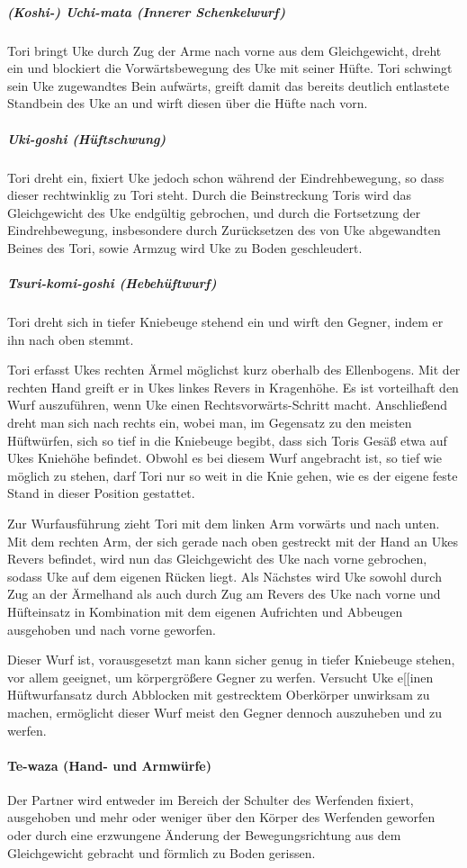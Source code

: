 \documentclass[justified, a4paper, notitlepage, captions=tableheading, nobib]{tufte-handout}
\begin{document}
\subparagraph{(Koshi-) Uchi-mata (Innerer Schenkelwurf)}
\label{sec:org84c4382}
Tori bringt Uke durch Zug der Arme nach vorne aus dem Gleichgewicht, dreht ein und blockiert die Vorwärtsbewegung des Uke mit seiner Hüfte. Tori schwingt sein Uke zugewandtes Bein aufwärts, greift damit das bereits deutlich entlastete Standbein des Uke an und wirft diesen über die Hüfte nach vorn.

\subparagraph{Uki-goshi (Hüftschwung)}
\label{sec:org3944742}
Tori dreht ein, fixiert Uke jedoch schon während der Eindrehbewegung, so dass dieser rechtwinklig zu Tori steht. Durch die Beinstreckung Toris wird das Gleichgewicht des Uke endgültig gebrochen, und durch die Fortsetzung der Eindrehbewegung, insbesondere durch Zurücksetzen des von Uke abgewandten Beines des Tori, sowie Armzug wird Uke zu Boden geschleudert.

\subparagraph{Tsuri-komi-goshi (Hebehüftwurf)}
\label{sec:org15ac607}
Tori dreht sich in tiefer Kniebeuge stehend ein und wirft den Gegner, indem er ihn nach oben stemmt.

Tori erfasst Ukes rechten Ärmel möglichst kurz oberhalb des Ellenbogens. Mit der rechten Hand greift er in Ukes linkes Revers in Kragenhöhe. Es ist vorteilhaft den Wurf auszuführen, wenn Uke einen Rechtsvorwärts-Schritt macht.
Anschließend dreht man sich nach rechts ein, wobei man, im Gegensatz zu den meisten Hüftwürfen, sich so tief in die Kniebeuge begibt, dass sich Toris Gesäß etwa auf Ukes Kniehöhe befindet. Obwohl es bei diesem Wurf angebracht ist, so tief wie möglich zu stehen, darf Tori nur so weit in die Knie gehen, wie es der eigene feste Stand in dieser Position gestattet.

Zur Wurfausführung zieht Tori mit dem linken Arm vorwärts und nach unten. Mit dem rechten Arm, der sich gerade nach oben gestreckt mit der Hand an Ukes Revers befindet, wird nun das Gleichgewicht des Uke nach vorne gebrochen, sodass Uke auf dem eigenen Rücken liegt. Als Nächstes wird Uke sowohl durch Zug an der Ärmelhand als auch durch Zug am Revers des Uke nach vorne und Hüfteinsatz in Kombination mit dem eigenen Aufrichten und Abbeugen ausgehoben und nach vorne geworfen.

Dieser Wurf ist, vorausgesetzt man kann sicher genug in tiefer Kniebeuge stehen, vor allem geeignet, um körpergrößere Gegner zu werfen.
Versucht Uke e[[inen Hüftwurfansatz durch Abblocken mit gestrecktem Oberkörper unwirksam zu machen, ermöglicht dieser Wurf meist den Gegner dennoch auszuheben und zu werfen.

\paragraph{Te-waza (Hand- und Armwürfe)}
\label{sec:orga12b019}
Der Partner wird entweder im Bereich der Schulter des Werfenden fixiert, ausgehoben und mehr oder weniger über den Körper des Werfenden geworfen oder durch eine erzwungene Änderung der Bewegungsrichtung aus dem Gleichgewicht gebracht und förmlich zu Boden gerissen.
\end{document}
